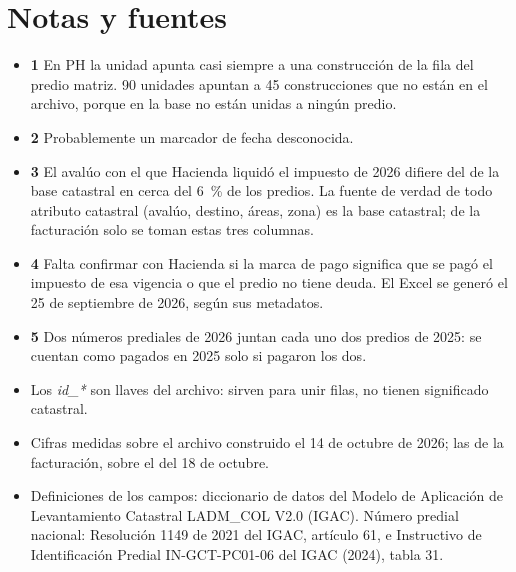 \documentclass[10pt,letterpaper]{article}
\begin{document}
\section{Notas y fuentes}

\begin{itemize}
\item \hypertarget{nota-1}{}\textbf{1} En PH la unidad apunta casi siempre a una
  construcción de la fila del predio matriz. 90 unidades apuntan a 45 construcciones que
  no están en el archivo, porque en la base no están unidas a ningún predio.
\item \hypertarget{nota-2}{}\textbf{2} Probablemente un marcador de fecha desconocida.
\item \hypertarget{nota-3}{}\textbf{3} El avalúo con el que Hacienda liquidó el impuesto de
  2026 difiere del de la base catastral en cerca del 6~\% de los predios. La fuente de verdad
  de todo atributo catastral (avalúo, destino, áreas, zona) es la base catastral; de la
  facturación solo se toman estas tres columnas.
\item \hypertarget{nota-4}{}\textbf{4} Falta confirmar con Hacienda si la marca de pago
  significa que se pagó el impuesto de esa vigencia o que el predio no tiene deuda. El
  Excel se generó el 25 de septiembre de 2026, según sus metadatos.
\item \hypertarget{nota-5}{}\textbf{5} Dos números prediales de 2026 juntan cada uno dos
  predios de 2025: se cuentan como pagados en 2025 solo si pagaron los dos.
\item Los \textit{id_*} son llaves del archivo: sirven para unir filas, no tienen
  significado catastral.
\item Cifras medidas sobre el archivo construido el 14 de octubre de 2026; las de la
  facturación, sobre el del 18 de octubre.
\item Definiciones de los campos: diccionario de datos del Modelo de Aplicación de
  Levantamiento Catastral LADM_COL V2.0 (IGAC). Número predial nacional: Resolución 1149 de
  2021 del IGAC, artículo 61, e Instructivo de Identificación Predial IN-GCT-PC01-06 del
  IGAC (2024), tabla 31.
\end{itemize}
\end{document}

